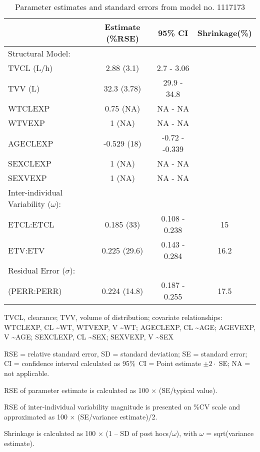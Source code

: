 \begin{table}[ht]
\begin{threeparttable}
\centering
\caption{Parameter estimates and standard errors from model no. 1117173} 
\label{tab:paramsum1117173}
\begingroup\small
\begin{tabular}{lccc}
  \hline
 & Estimate (\%RSE) & 95\% CI & Shrinkage(\%) \\ 
  \hline
Structural Model: &  &  &  \\ 
  TVCL (L/h)& 2.88 (3.1) & 2.7 - 3.06 &  \\ 
  TVV (L)& 32.3 (3.78) & 29.9 - 34.8 &  \\ 
  WTCLEXP & 0.75 (NA) & NA - NA &  \\ 
  WTVEXP & 1 (NA) & NA - NA &  \\ 
  AGECLEXP & -0.529 (18) & -0.72 - -0.339 &  \\ 
  SEXCLEXP & 1 (NA) & NA - NA &  \\ 
  SEXVEXP & 1 (NA) & NA - NA &  \\ 
  Inter-individual Variability ($\omega$): &  &  &  \\ 
  ETCL:ETCL & 0.185 (33) & 0.108 - 0.238 & 15 \\ 
  ETV:ETV & 0.225 (29.6) & 0.143 - 0.284 & 16.2 \\ 
  Residual Error ($\sigma$): &  &  &  \\ 
   (PERR:PERR) & 0.224 (14.8) & 0.187 - 0.255 & 17.5 \\ 
   \hline
\end{tabular}
\endgroup
\begin{tablenotes}\footnotesize
\item[] TVCL, clearance; TVV, volume of distribution; covariate relationships: WTCLEXP, CL \textasciitilde WT, WTVEXP, V \textasciitilde WT; AGECLEXP, CL \textasciitilde AGE; AGEVEXP, V \textasciitilde AGE; SEXCLEXP, CL \textasciitilde SEX; SEXVEXP, V \textasciitilde SEX
\item[] RSE = relative standard error, SD = standard deviation; SE = standard error; CI = confidence interval calculated as 95\%~CI = Point estimate $\pm 2 \cdot$ SE; NA = not applicable.
\item[] RSE of parameter estimate is calculated as 100 × (SE/typical value).
\item[] RSE of inter-individual variability magnitude is presented on \%CV scale and approximated as 100 × (SE/variance estimate)/2.
\item[] Shrinkage is calculated as 100 × (1 – SD of post hocs/$\omega$), with $\omega$ = sqrt(variance estimate).
\end{tablenotes}
\end{threeparttable}
\end{table}
